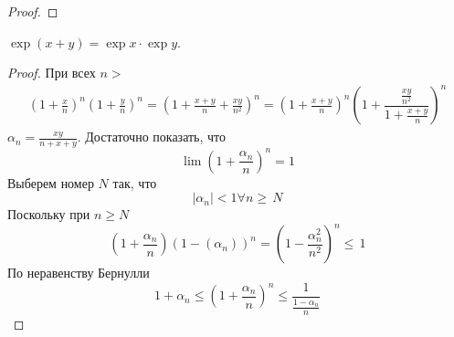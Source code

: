 \begin{proof}
\end{proof} \begin{proposition}
     $ \exp(x + y) = \exp x \cdot \exp y $.
\end{proposition} \begin{proof}
    При всех $ n > $ \begin{multline}
        \left(1 + \frac{x}{n}\right)^n\left(1 + \frac{y}{n}\right)^n = ( 1 + \frac{x + y}{n} + \frac{xy}{n^2}  )^n = (1 + \frac{x + y}{n} )^n\left(1 + \dfrac{\frac{xy}{n^2} }{1 + \frac{x + y}{n} }\right)^ n
    \end{multline}
    $ \alpha_n = \frac{xy}{n + x + y}  $. Достаточно показать, что \begin{equation}
        \lim(1 + \frac{\alpha_n}{n} )^n = 1
    \end{equation}
    Выберем номер $ N $ так, что \begin{equation}
        |\alpha_n| < 1 \forall n \geq\, N
    \end{equation}
    Поскольку при $ n \geq N $ \begin{equation}
        \left(1 + \frac{\alpha_n}{n} \right)\left(1 - (\alpha_n)\right)^n = (1 - \frac{\alpha_n^2}{n^2} )^n \leq\, 1
    \end{equation}
    По неравенству Бернулли \begin{equation}
        1 + \alpha_n \leq \left(1 + \frac{\alpha_n}{n} \right)^n \leq \frac{1}{\frac{1 - \alpha_n}{n} }
    \end{equation}
    
    
\end{proof}
